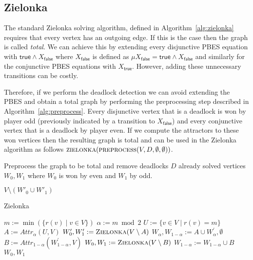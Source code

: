 \documentclass{article}
\newcommand{\attrsym}{\ensuremath{\textit{Attr}}}
\newcommand{\attr}[3][]{\ensuremath{\attrsym^{#1}_{#2}(#3)}}
\begin{document}
\subsection{Zielonka}

The standard Zielonka solving algorithm, defined in Algorithm~\ref{alg:zielonka} requires that every vertex has an outgoing edge.
If this is the case then the graph is called \emph{total}.
We can achieve this by extending every disjunctive PBES equation with $\textsf{true} \land X_\textsf{false}$ where $X_\textsf{false}$ is defined as $\mu X_\textsf{false} = \textsf{true} \land X_\textsf{false}$ and similarly for the conjunctive PBES equations with $X_\textsf{true}$.
However, adding these unnecessary transitions can be costly.

Therefore, if we perform the deadlock detection we can avoid extending the PBES and obtain a total graph by performing the preprocessing step described in Algorithm~\ref{alg:preprocess}.
Every disjunctive vertex that is a deadlock is won by player odd (previously indicated by a transition to $X_\textsf{false}$) and every conjunctive vertex that is a deadlock by player even.
If we compute the attractors to these won vertices then the resulting graph is total and can be used in the Zielonka algorithm as follows $\textsc{zielonka}(\textsc{preprocess}(V, D, \emptyset, \emptyset))$.

\begin{algorithm}[H]
\caption{Preprocess the graph to be total and remove deadlocks $D$ already solved vertices $W_0, W_1$ where $W_0$ is won by even and $W_1$ by odd.}
\label{alg:preprocess}
\begin{algorithmic}[1]
	
	\State {$W'_0 \gets \attr{0}{W'_0, V}$}
	\State {$W'_1 \gets \attr{1}{W'_1, V}$}
	
	\State \Return $V \setminus (W'_0 \cup W'_1)$
\EndFunction
\end{algorithmic}
\end{algorithm}

\begin{algorithm}[H]
\caption{Zielonka}
\label{alg:zielonka}
\begin{algorithmic}[1]
  \State \Return {$\emptyset, \emptyset$}
\EndIf
\State $m:=\min (\{r(v)\mid v\in V\})$ 
\State $\alpha := m \bmod 2$
\State $U:=\{v\in V\mid r(v)=m\}$ 
\State $A := \attr{\alpha}{U,V}$
\State $W_{0}^{\prime },W_{1}^{\prime}:= \textsc{Zielonka}(V\setminus A)$
  \State $W_{\alpha },W_{1-\alpha }:=A\cup W_{\alpha }^{\prime},\emptyset$ 
\Else
  \State $B := \attr{1-\alpha}{W_{1-\alpha }^{\prime }, V}$
  \State $W_{0},W_{1}:=\textsc{Zielonka}(V\setminus B)$ 
  \State $W_{1-\alpha } := W_{1-\alpha }\cup B$ 
\EndIf
\State \Return $W_{0},W_{1}$
\EndFunction
\end{algorithmic}
\end{algorithm}
\end{document}
